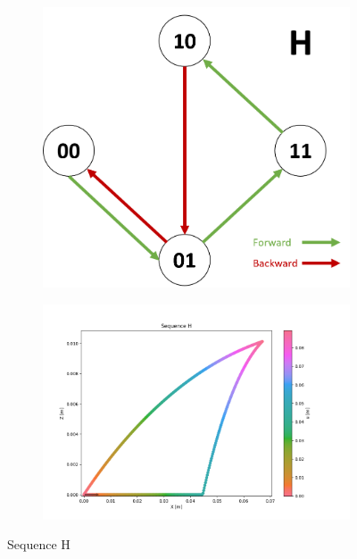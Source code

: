         \begin{figure}[h]
            \begin{subfigure}{.3\textwidth}
            \includegraphics[width=\textwidth]{images/S_H.png}
            \end{subfigure}%
            \begin{subfigure}{.7\textwidth}
            \includegraphics[width=\textwidth]{images/H.png}
            \end{subfigure}
            \caption{Sequence H}
        \end{figure}

